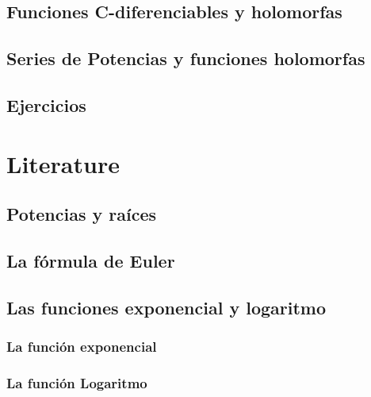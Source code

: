 \documentclass[]{book}
\theoremstyle{definition}
\theoremstyle{definition}
\theoremstyle{definition}
\theoremstyle{remark}
\begin{document}
\hypertarget{funciones-c-diferenciables-y-holomorfas}{%
\section{Funciones C-diferenciables y holomorfas}\label{funciones-c-diferenciables-y-holomorfas}}

\hypertarget{series-de-potencias-y-funciones-holomorfas}{%
\section{Series de Potencias y funciones holomorfas}\label{series-de-potencias-y-funciones-holomorfas}}

\hypertarget{ejercicios-1}{%
\section{Ejercicios}\label{ejercicios-1}}

\hypertarget{literature}{%
\chapter{Literature}\label{literature}}

\hypertarget{potencias-y-rauxedces}{%
\section{Potencias y raíces}\label{potencias-y-rauxedces}}

\hypertarget{la-fuxf3rmula-de-euler}{%
\section{La fórmula de Euler}\label{la-fuxf3rmula-de-euler}}

\hypertarget{las-funciones-exponencial-y-logaritmo}{%
\section{Las funciones exponencial y logaritmo}\label{las-funciones-exponencial-y-logaritmo}}

\hypertarget{la-funciuxf3n-exponencial}{%
\subsection{La función exponencial}\label{la-funciuxf3n-exponencial}}

\hypertarget{la-funciuxf3n-logaritmo}{%
\subsection{La función Logaritmo}\label{la-funciuxf3n-logaritmo}}
\end{document}

